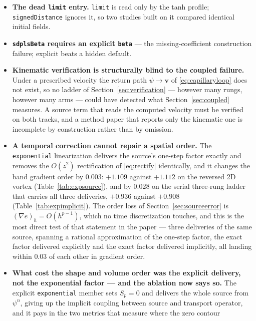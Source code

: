 \documentclass[preprint,3p,11pt]{elsarticle}
\newcommand{\psilev}{\psi}
\begin{document}
\begin{itemize}
    is exact only while the interface is resolved; near $\kappa h \sim 1$ the
    reconstructed normal, and hence $f_{nl}$, is unreliable.
  \item \textbf{The dead \texttt{limit} entry.} \texttt{limit} is read only by
    the tanh profile; \texttt{signedDistance} ignores it, so two studies built
    on it compared identical initial fields.
  \item \textbf{\texttt{sdplsBeta} requires an explicit \texttt{beta}} --- the
    missing-coefficient construction failure; explicit beats a hidden default.
  \item \textbf{Kinematic verification is structurally blind to the coupled
    failure.} Under a prescribed velocity the return path
    $\psilev \rightarrow \mathbf{v}$ of \eqref{eq:capillaryloop} does not exist,
    so no ladder of Section~\ref{sec:verification} --- however many rungs, however
    many arms --- could have detected what Section~\ref{sec:coupled} measures. A
    source term that reads the computed velocity must be verified on both tracks,
    and a method paper that reports only the kinematic one is incomplete by
    construction rather than by omission.
  \item \textbf{A temporal correction cannot repair a spatial order.} The
    \texttt{exponential} linearization delivers the source's one-step factor
    exactly and removes the $O(z^2)$ rectification of \eqref{eq:rectify}
    identically, and it changes the band gradient order by $0.003$: $+1.109$
    against $+1.112$ on the reversed 2D vortex (Table~\ref{tab:expsource}), and
    by $0.028$ on the serial three-rung ladder that carries all three deliveries,
    $+0.936$ against $+0.908$ (Table~\ref{tab:expimplicit}). The order loss of
    Section~\ref{sec:sourceerror} is $(\nabla e)_h = O(h^{p-1})$, which no time
    discretization touches, and this is the most direct test of that statement in
    the paper --- three deliveries of the same source, spanning a rational
    approximation of the one-step factor, the exact factor delivered explicitly
    and the exact factor delivered implicitly, all landing within $0.03$ of each
    other in gradient order.
  \item \textbf{What cost the shape and volume order was the explicit delivery,
    not the exponential factor --- and the ablation now says so.} The explicit
    \texttt{exponential} member sets $S_p = 0$ and delivers the whole source from
    $\psilev^n$, giving up the implicit coupling between source and transport
    operator, and it pays in the two metrics that measure where the zero contour

\end{itemize}
\end{document}
